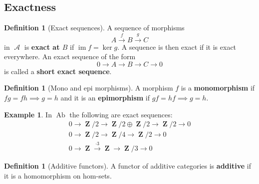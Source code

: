 \documentclass[10pt,]{book}
\newcommand{\terminology}[1]{\textbf{#1}}
\theoremstyle{plain}
\theoremstyle{definition}
\newtheorem{definition}[theorem]{Definition}
\newtheorem{example}[theorem]{Example}
\numberwithin{equation}{section}
\DeclareMathOperator{\im}{im}
\DeclareMathOperator{\Ab}{\text{Ab}}
\DeclareMathOperator{\ZZ}{\mathbf{Z}}
\DeclareMathOperator{\cA}{\mathcal{A}}
\begin{document}
\subsection[Exactness]{Exactness}\label{sec-exactness}
\begin{definition}[Exact sequences]\label{definition-3}
A sequence of morphisms \[A\xrightarrow{f} B \xrightarrow{g}C\] in \(\cA\) is \terminology{exact at \(B\)} if \(\im f = \ker g\).
              A sequence is then exact if it is exact everywhere.
              An exact sequence of the form \[0\to A \to B \to C \to 0\] is called a \terminology{short exact sequence}.
            \end{definition}
\begin{definition}[Mono and epi morphisms]\label{definition-4}
A morphism \(f\) is a \terminology{monomorphism} if \(fg = fh \implies g=h\) and it is an \terminology{epimorphism} if \(gf = hf \implies g=h\).\end{definition}
\begin{example}\label{example-4}
In \(\Ab\) the following are exact sequences:
              \begin{gather*}
0\to \ZZ/2 \to \ZZ/2 \oplus \ZZ/2 \to \ZZ/2 \to 0\\
0\to \ZZ/2 \to \ZZ/4\to \ZZ/2 \to 0\\
0\to \ZZ \xrightarrow{\cdot 3} \ZZ\to \ZZ/3 \to 0
\end{gather*}\end{example}
\begin{definition}[Additive functors]\label{definition-5}
A functor of additive categories is \terminology{additive} if it is a homomorphism on hom-sets.\end{definition}
\typeout{************************************************}
\typeout{************************************************}
\end{document}
